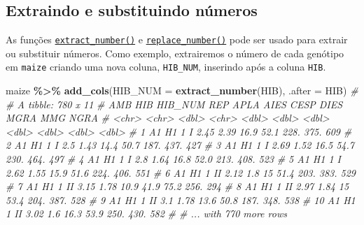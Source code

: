 \documentclass[
]{book}
\newenvironment{Shaded}{\begin{snugshade}}{\end{snugshade}}
\newcommand{\CommentTok}[1]{\textcolor[rgb]{0.56,0.35,0.01}{\textit{#1}}}
\newcommand{\DataTypeTok}[1]{\textcolor[rgb]{0.13,0.29,0.53}{#1}}
\newcommand{\KeywordTok}[1]{\textcolor[rgb]{0.13,0.29,0.53}{\textbf{#1}}}
\newcommand{\NormalTok}[1]{#1}
\newcommand{\OperatorTok}[1]{\textcolor[rgb]{0.81,0.36,0.00}{\textbf{#1}}}
\newcommand{\StringTok}[1]{\textcolor[rgb]{0.31,0.60,0.02}{#1}}
\numberwithin{equation}{section}
\begin{document}
\hypertarget{extraindo-e-substituindo-nuxfameros}{%
\subsection{Extraindo e substituindo números}\label{extraindo-e-substituindo-nuxfameros}}

As funções \href{https://tiagoolivoto.github.io/metan/reference/utils_num_str.html}{\texttt{extract\_number()}} e \href{https://tiagoolivoto.github.io/metan/\%20reference\%20/\%20utils_num_str.html}{\texttt{replace\_number()}} pode ser usado para extrair ou substituir números. Como exemplo, extrairemos o número de cada genótipo em \texttt{maize} criando uma nova coluna, \texttt{HIB\_NUM}, inserindo após a coluna \texttt{HIB}.

\begin{Shaded}
\begin{Highlighting}[]
\NormalTok{maize }\OperatorTok{\%\textgreater{}\%}\StringTok{ }\KeywordTok{add\_cols}\NormalTok{(}\DataTypeTok{HIB\_NUM =} \KeywordTok{extract\_number}\NormalTok{(HIB), }\DataTypeTok{.after =}\NormalTok{ HIB)}
\CommentTok{\# \# A tibble: 780 x 11}
\CommentTok{\#    AMB   HIB   HIB\_NUM REP    APLA  AIES  CESP  DIES  MGRA   MMG  NGRA}
\CommentTok{\#    \textless{}chr\textgreater{} \textless{}chr\textgreater{}   \textless{}dbl\textgreater{} \textless{}chr\textgreater{} \textless{}dbl\textgreater{} \textless{}dbl\textgreater{} \textless{}dbl\textgreater{} \textless{}dbl\textgreater{} \textless{}dbl\textgreater{} \textless{}dbl\textgreater{} \textless{}dbl\textgreater{}}
\CommentTok{\#  1 A1    H1          1 I      2.45  2.39  16.9  52.1 228.   375.   609}
\CommentTok{\#  2 A1    H1          1 I      2.5   1.43  14.4  50.7 187.   437.   427}
\CommentTok{\#  3 A1    H1          1 I      2.69  1.52  16.5  54.7 230.   464.   497}
\CommentTok{\#  4 A1    H1          1 I      2.8   1.64  16.8  52.0 213.   408.   523}
\CommentTok{\#  5 A1    H1          1 I      2.62  1.55  15.9  51.6 224.   406.   551}
\CommentTok{\#  6 A1    H1          1 II     2.12  1.8   15    51.4 203.   383.   529}
\CommentTok{\#  7 A1    H1          1 II     3.15  1.78  10.9  41.9  75.2  256.   294}
\CommentTok{\#  8 A1    H1          1 II     2.97  1.84  15    53.4 204.   387.   528}
\CommentTok{\#  9 A1    H1          1 II     3.1   1.78  13.6  50.8 187.   348.   538}
\CommentTok{\# 10 A1    H1          1 II     3.02  1.6   16.3  53.9 250.   430.   582}
\CommentTok{\# \# ... with 770 more rows}
\end{Highlighting}
\end{Shaded}
\end{document}
